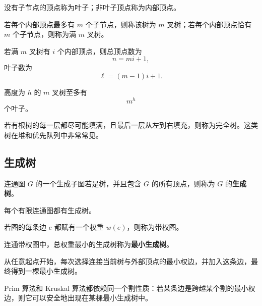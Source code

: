 \begin{definition}
没有子节点的顶点称为叶子；非叶子顶点称为内部顶点。
\end{definition}

\begin{definition}
若每个内部顶点最多有 $m$ 个子节点，则称该树为 $m$ 叉树；若每个内部顶点恰有 $m$ 个子节点，则称为满 $m$ 叉树。
\end{definition}

\begin{theorem}
若满 $m$ 叉树有 $i$ 个内部顶点，则总顶点数为
\[
    n=mi+1,
\]
叶子数为
\[
    \ell=(m-1)i+1.
\]
\end{theorem}

\begin{theorem}
高度为 $h$ 的 $m$ 叉树至多有
\[
    m^h
\]
个叶子。
\end{theorem}

\begin{definition}
若有根树的每一层都尽可能填满，且最后一层从左到右填充，则称为完全树。这类树在堆和优先队列中非常常见。
\end{definition}

\subsection{生成树}

\begin{definition}[生成树]
连通图 $G$ 的一个生成子图若是树，并且包含 $G$ 的所有顶点，则称为 $G$ 的\textbf{生成树}。
\end{definition}

\begin{theorem}
每个有限连通图都有生成树。
\end{theorem}

\begin{definition}[带权图]
若图的每条边 $e$ 都赋有一个权重 $w(e)$，则称为带权图。
\end{definition}

\begin{definition}[最小生成树]
连通带权图中，总权重最小的生成树称为\textbf{最小生成树}。
\end{definition}

\begin{theorem}
从任意起点开始，每次选择连接当前树与外部顶点的最小权边，并加入这条边，最终得到一棵最小生成树。
\end{theorem}

\begin{remark}
Prim 算法和 Kruskal 算法都依赖同一个割性质：若某条边是跨越某个割的最小权边，则它可以安全地出现在某棵最小生成树中。
\end{remark}

